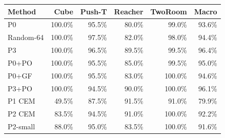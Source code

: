 \begin{tabular}{lrrrrr}
\toprule
Method & Cube & Push-T & Reacher & TwoRoom & Macro \\
\midrule
P0 & 100.0\% & 95.5\% & 80.0\% & 99.0\% & 93.6\% \\
Random-64 & 100.0\% & 97.5\% & 82.0\% & 98.0\% & 94.4\% \\
P3 & 100.0\% & 96.5\% & 89.5\% & 99.5\% & 96.4\% \\
P0+PO & 100.0\% & 95.5\% & 85.0\% & 99.5\% & 95.0\% \\
P0+GF & 100.0\% & 95.5\% & 83.0\% & 100.0\% & 94.6\% \\
P3+PO & 100.0\% & 94.5\% & 90.0\% & 100.0\% & 96.1\% \\
P1 CEM & 49.5\% & 87.5\% & 91.5\% & 91.0\% & 79.9\% \\
P2 CEM & 83.5\% & 94.5\% & 91.0\% & 100.0\% & 92.2\% \\
P2-small & 88.0\% & 95.0\% & 83.5\% & 100.0\% & 91.6\% \\
\bottomrule
\end{tabular}
